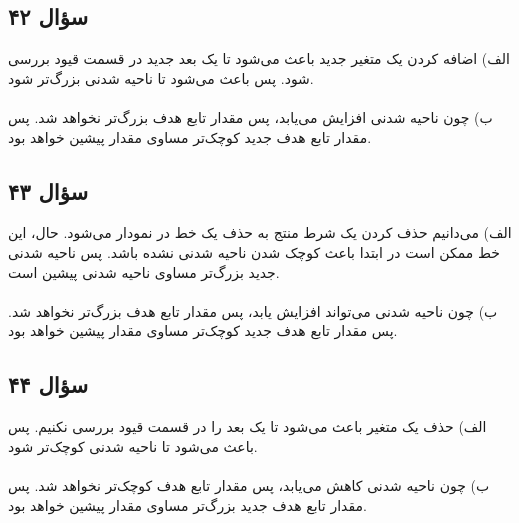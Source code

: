 \subsection*{سؤال ۴۲}
الف) اضافه کردن یک متغیر جدید باعث می‌شود تا یک بعد جدید در قسمت قیود بررسی شود. پس باعث می‌شود تا ناحیه شدنی بزرگ‌تر شود. \\ \\
ب) چون ناحیه شدنی افزایش می‌یابد، پس مقدار تابع هدف بزرگ‌تر نخواهد شد. پس مقدار تابع هدف جدید کوچک‌تر مساوی مقدار پیشین خواهد بود.

\subsection*{سؤال ۴۳}
الف) می‌دانیم حذف کردن یک شرط منتج به حذف یک خط در نمودار می‌شود. حال، این خط ممکن است در ابتدا باعث کوچک شدن ناحیه شدنی نشده باشد. پس ناحیه شدنی جدید بزرگ‌تر مساوی ناحیه شدنی پیشین است. \\ \\
ب) چون ناحیه شدنی می‌تواند افزایش یابد، پس مقدار تابع هدف بزرگ‌تر نخواهد شد. پس مقدار تابع هدف جدید کوچک‌تر مساوی مقدار پیشین خواهد بود.

\subsection*{سؤال ۴۴}
الف) حذف یک متغیر باعث می‌شود تا یک بعد را در قسمت قیود بررسی نکنیم. پس باعث می‌شود تا ناحیه شدنی کوچک‌تر شود. \\ \\
ب) چون ناحیه شدنی کاهش می‌یابد، پس مقدار تابع هدف کوچک‌تر نخواهد شد. پس مقدار تابع هدف جدید بزرگ‌تر مساوی مقدار پیشین خواهد بود.



